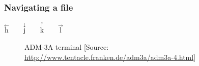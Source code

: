 \documentclass[%
        hyperref={%
                pdfauthor={Zakariyya Mughal},%
                pdfpagemode={None},pdfpagelayout={SinglePage}}%
        xcolor={x11names},%
]{beamer}
\begin{document}
\begin{frame}[allowframebreaks]
\frametitle{Navigating a file}
\begin{center}
\Huge
$\overset{\leftarrow}{\text{h}}\qquad
\overset{\downarrow}{\text{j}}\qquad
\overset{\uparrow}{\text{k}}\qquad
\overset{\rightarrow}{\text{l}}$
\end{center}
\framebreak
\begin{figure}
\caption{ADM-3A terminal {\tiny [Source:
\url{http://www.tentacle.franken.de/adm3a/adm3a-4.html}]
} }
\end{figure}
\framebreak
\begin{figure}

\end{figure}
\end{frame}
\end{document}

